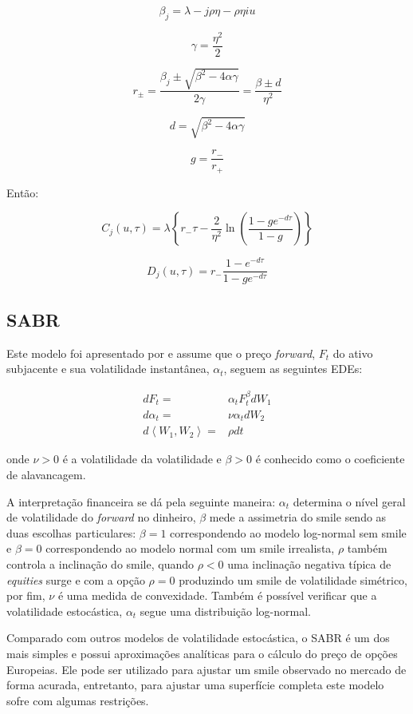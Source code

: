 \documentclass[]{book}
\theoremstyle{definition}
\theoremstyle{definition}
\theoremstyle{definition}
\theoremstyle{remark}
\begin{document}
\[\beta_j=\lambda-j\rho\eta-\rho\eta i u\]

\[\gamma=\frac{\eta^2}{2}\]

\[r_{\pm}=\frac{\beta_j\pm\sqrt{\beta^2-4\alpha\gamma}}{2\gamma}=\frac{\beta\pm d}{\eta^2}\]

\[d=\sqrt{\beta^2-4\alpha\gamma}\]

\[g=\frac{r_-}{r_+}\]

Então:

\[C_j(u, \tau)=\lambda\left\lbrace  r_-\tau-\frac{2}{\eta^2}\ln\left(\frac{1-ge^{-d\tau}}{1-g}\right) \right\rbrace
\label{eq:cj}\]

\[D_j(u, \tau)=r_-\frac{1-e^{-d\tau}}{1-ge^{-d\tau}}
\label{eq:dj}\]

\subsection{SABR}\label{sabr}

Este modelo foi apresentado por \citet{Hagan2002} e assume que o preço
\emph{forward}, \(F_t\) do ativo subjacente e sua volatilidade
instantânea, \(\alpha_t\), seguem as seguintes EDEs:

\[
\begin{aligned}
dF_t=&\alpha_tF_t^\beta dW_1\\
d\alpha_t=&\nu\alpha_t dW_2\\
d\left\langle W_1, W_2 \right\rangle =&\rho dt
\end{aligned}
\label{eq:sabr}
\]

onde \(\nu > 0\) é a volatilidade da volatilidade e \(\beta > 0\) é
conhecido como o coeficiente de alavancagem.

A interpretação financeira se dá pela seguinte maneira: \(\alpha_t\)
determina o nível geral de volatilidade do \emph{forward} no dinheiro,
\(\beta\) mede a assimetria do smile sendo as duas escolhas
particulares: \(\beta = 1\) correspondendo ao modelo log-normal sem
smile e \(\beta = 0\) correspondendo ao modelo normal com um smile
irrealista, \(\rho\) também controla a inclinação do smile, quando
\(\rho < 0\) uma inclinação negativa típica de \emph{equities} surge e
com a opção \(\rho = 0\) produzindo um smile de volatilidade simétrico,
por fim, \(\nu\) é uma medida de convexidade. Também é possível
verificar que a volatilidade estocástica, \(\alpha_t\) segue uma
distribuição log-normal.

Comparado com outros modelos de volatilidade estocástica, o SABR é um
dos mais simples e possui aproximações analíticas para o cálculo do
preço de opções Europeias. Ele pode ser utilizado para ajustar um smile
observado no mercado de forma acurada, entretanto, para ajustar uma
superfície completa este modelo sofre com algumas restrições.
\end{document}
